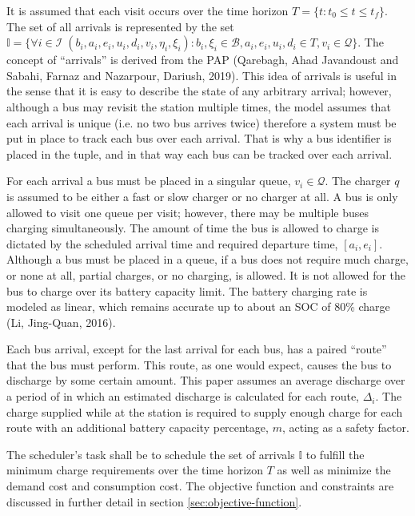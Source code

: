 \documentclass[11pt,a4paper,final]{article}
\newcommand{\visit}{(b_i, a_i, e_i, u_i, d_i, v_i, \eta_i, \xi_i)}
\newcommand{\I}{\mathbb{I}}                 %
\newcommand{\Iset}{\mathcal{I}}             %
\newcommand{\Bset}{\mathcal{B}}             %
\newcommand{\Qset}{\mathcal{Q}}             %
\begin{document}
It is assumed that each visit occurs over the time horizon \(T = \{t : t_0 \le t \le t_f \}\). The set of all arrivals is
represented by the set \(\I = \{\forall i \in \Iset \; \visit: b_i, \xi_i \in \Bset, a_i, e_i, u_i, d_i \in T, v_i \in \Qset \}\). The
concept of ``arrivals'' is derived from the PAP (Qarebagh, Ahad Javandoust and Sabahi, Farnaz and Nazarpour, Dariush, 2019). This idea of arrivals is useful in the
sense that it is easy to describe the state of any arbitrary arrival; however, although a bus may revisit the station
multiple times, the model assumes that each arrival is unique (i.e. no two bus arrives twice) therefore a system must be
put in place to track each bus over each arrival. That is why a bus identifier is placed in the tuple, and in that way
each bus can be tracked over each arrival.

For each arrival a bus must be placed in a singular queue, \(v_i \in \Qset\). The charger \(q\) is assumed to be either a fast
or slow charger or no charger at all. A bus is only allowed to visit one queue per visit; however, there may be multiple
buses charging simultaneously. The amount of time the bus is allowed to charge is dictated by the scheduled arrival time
and required departure time, \([a_i, e_i]\). Although a bus must be placed in a queue, if a bus does not require much
charge, or none at all, partial charges, or no charging, is allowed. It is not allowed for the bus to charge over its
battery capacity limit. The battery charging rate is modeled as linear, which remains accurate up to about an SOC of 80\%
charge (Li, Jing-Quan, 2016).

Each bus arrival, except for the last arrival for each bus, has a paired ``route'' that the bus must perform. This route,
as one would expect, causes the bus to discharge by some certain amount. This paper assumes an average discharge over a
period of in which an estimated discharge is calculated for each route, \(\Delta_i\). The charge supplied while at the station
is required to supply enough charge for each route with an additional battery capacity percentage, \(m\), acting as a
safety factor.

The scheduler's task shall be to schedule the set of arrivals \(\I\) to fulfill the minimum charge requirements over the
time horizon \(T\) as well as minimize the demand cost and consumption cost. The objective function and constraints are
discussed in further detail in section \ref{sec:objective-function}.
\end{document}
